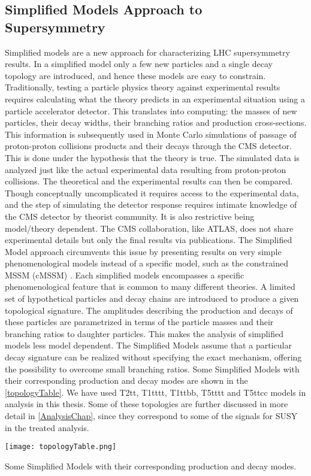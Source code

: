 \subsection{Simplified Models Approach to Supersymmetry}

Simplified models \cite{SSM} are a new approach for characterizing LHC supersymmetry results. In a simplified model only a few new particles and a single decay topology are introduced, and hence these models are easy to constrain. Traditionally, testing a particle physics theory against experimental results requires calculating what the theory predicts in an experimental situation using a particle accelerator detector. This translates into computing: the masses of new particles, their decay widths, their branching ratios and production cross-sections. This information is subsequently used in Monte Carlo simulations of passage of proton-proton collisions products and their decays through the CMS detector. This is done under the hypothesis that the theory is true. The simulated data is  analyzed just like the actual experimental data resulting from proton-proton collisions. The theoretical and the experimental results can then be compared. Though conceptually uncomplicated it requires access to the experimental data, and the step of simulating the detector response requires intimate knowledge of the CMS detector by theorist community. It is also restrictive being model/theory dependent. The CMS collaboration, like ATLAS, does not share experimental details but only the final results via publications. The Simplified Model approach circumvents this issue by presenting results on very simple phenomenological models instead of a specific model, such as the constrained MSSM (cMSSM) \cite{cMSSM}. Each simplified models encompasses a specific phenomenological feature that is common to many different theories. A limited set of hypothetical particles and decay chains are introduced to produce a given topological signature. The amplitudes describing the production and decays of these particles are parametrized in terms of the particle masses and their branching ratios to daughter particles. This makes the analysis of simplified models less model dependent. The Simplified Models assume that a particular decay signature can be realized without specifying the exact mechanism, offering the possibility to overcome small branching ratios. Some Simplified Models with their corresponding production and decay modes are shown in the \autoref{topologyTable}. We have used T2tt, T1tttt, T1ttbb, T5tttt and T5ttcc models in analysis in this thesis. Some of these topologies are further discussed in more detail in \autoref{AnalysisChap}, since they correspond to some of the signals for SUSY in the treated analysis.

\begin{table}[H]
\begin{center}
\texttt{[image: topologyTable.png]}
\caption{Some Simplified Models with their corresponding production and decay modes.}
\label{topologyTable}
\end{center}
\end{table}


